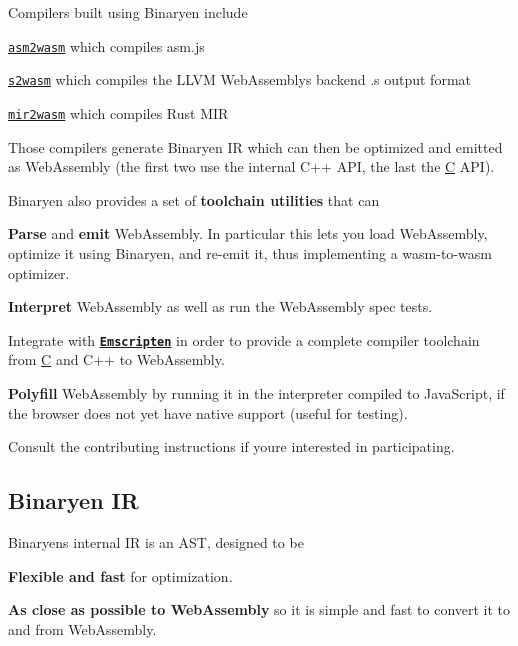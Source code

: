 Compilers built using Binaryen include


\begin{DoxyItemize}
\item \href{https://github.com/WebAssembly/binaryen/blob/master/src/asm2wasm.h}{\tt {\ttfamily asm2wasm}} which compiles asm.\+js
\item \href{https://github.com/WebAssembly/binaryen/blob/master/src/s2wasm.h}{\tt {\ttfamily s2wasm}} which compiles the L\+L\+VM Web\+Assembly\textquotesingle{}s backend {\ttfamily .s} output format
\item \href{https://github.com/brson/mir2wasm/}{\tt {\ttfamily mir2wasm}} which compiles Rust M\+IR
\end{DoxyItemize}

Those compilers generate Binaryen IR which can then be optimized and emitted as Web\+Assembly (the first two use the internal C++ A\+PI, the last the \mbox{\hyperlink{struct_c}{C}} A\+PI).

Binaryen also provides a set of {\bfseries toolchain utilities} that can


\begin{DoxyItemize}
\item {\bfseries Parse} and {\bfseries emit} Web\+Assembly. In particular this lets you load Web\+Assembly, optimize it using Binaryen, and re-\/emit it, thus implementing a wasm-\/to-\/wasm optimizer.
\item {\bfseries Interpret} Web\+Assembly as well as run the Web\+Assembly spec tests.
\item Integrate with {\bfseries \href{http://emscripten.org}{\tt Emscripten}} in order to provide a complete compiler toolchain from \mbox{\hyperlink{struct_c}{C}} and C++ to Web\+Assembly.
\item {\bfseries Polyfill} Web\+Assembly by running it in the interpreter compiled to Java\+Script, if the browser does not yet have native support (useful for testing).
\end{DoxyItemize}

Consult the contributing instructions if you\textquotesingle{}re interested in participating.

\subsection*{Binaryen IR}

Binaryen\textquotesingle{}s internal IR is an A\+ST, designed to be


\begin{DoxyItemize}
\item {\bfseries Flexible and fast} for optimization.
\item {\bfseries As close as possible to Web\+Assembly} so it is simple and fast to convert it to and from Web\+Assembly.
\end{DoxyItemize}

